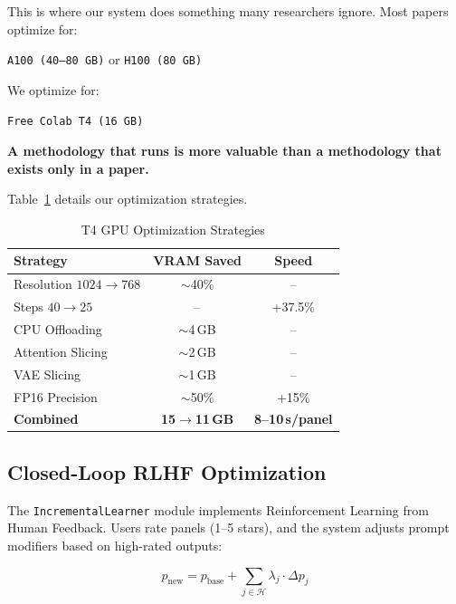\documentclass[11pt,a4paper,twocolumn]{article}
\begin{document}
This is where our system does something many researchers ignore. Most papers optimize for:

\begin{center}
\texttt{A100 (40--80\,GB)} \quad or \quad \texttt{H100 (80\,GB)}
\end{center}

We optimize for:

\begin{center}
\texttt{Free Colab T4 (16\,GB)}
\end{center}

\textbf{A methodology that runs is more valuable than a methodology that exists only in a paper.}

Table~\ref{tab:t4opt} details our optimization strategies.

\begin{table}[H]
\caption{T4 GPU Optimization Strategies}
\label{tab:t4opt}
\centering
\scriptsize
\begin{tabular}{lcc}
\toprule
\textbf{Strategy} & \textbf{VRAM Saved} & \textbf{Speed} \\
\midrule
Resolution $1024 \to 768$ & $\sim$40\% & -- \\
Steps $40 \to 25$ & -- & +37.5\% \\
CPU Offloading & $\sim$4\,GB & -- \\
Attention Slicing & $\sim$2\,GB & -- \\
VAE Slicing & $\sim$1\,GB & -- \\
FP16 Precision & $\sim$50\% & +15\% \\
\midrule
\textbf{Combined} & \textbf{15$\to$11\,GB} & \textbf{8--10\,s/panel} \\
\bottomrule
\end{tabular}
\end{table}

\subsection{Closed-Loop RLHF Optimization}
\label{sec:rlhf}

The \texttt{IncrementalLearner} module implements Reinforcement Learning from Human Feedback. Users rate panels (1--5 stars), and the system adjusts prompt modifiers based on high-rated outputs:

\begin{equation}
p_{\text{new}} = p_{\text{base}} + \sum_{j \in \mathcal{H}} \lambda_j \cdot \Delta p_j
\label{eq:rlhf}
\end{equation}
\end{document}
